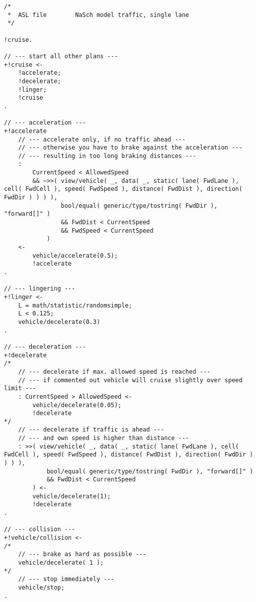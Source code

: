 \begin{lstlisting}[style=asl, 
                   keywords={+!cruise,+!accelerate,+!linger,+!decelerate,+!vehicle/collision}, 
                   keywords={[2]}, 
                   keywords={[3]}, 
                   caption={Agentenscript: NaSch-Modell, einspurig},
                   label={lst:nasch}]      
/*
 *  ASL file        NaSch model traffic, single lane
 */

!cruise.

// --- start all other plans ---
+!cruise <-
    !accelerate;
    !decelerate;
    !linger;
    !cruise
.

// --- acceleration ---
+!accelerate
    // --- accelerate only, if no traffic ahead ---
    // --- otherwise you have to brake against the acceleration ---
    // --- resulting in too long braking distances ---
    : 
        CurrentSpeed < AllowedSpeed
        && ~>>( view/vehicle( _, data( _, static( lane( FwdLane ), cell( FwdCell ), speed( FwdSpeed ), distance( FwdDist ), direction( FwdDir ) ) ) ),
                bool/equal( generic/type/tostring( FwdDir ), "forward[]" )
                && FwdDist < CurrentSpeed
                && FwdSpeed < CurrentSpeed
            )
    <-
        vehicle/accelerate(0.5);
        !accelerate
.

// --- lingering ---
+!linger <-
    L = math/statistic/randomsimple;
    L < 0.125;
    vehicle/decelerate(0.3)
.

// --- deceleration ---
+!decelerate 
/*
    // --- decelerate if max. allowed speed is reached ---
    // --- if commented out vehicle will cruise slightly over speed limit ---
    : CurrentSpeed > AllowedSpeed <-
        vehicle/decelerate(0.05);
        !decelerate
*/
    // --- decelerate if traffic is ahead ---
    // --- and own speed is higher than distance ---
    : >>( view/vehicle( _, data( _, static( lane( FwdLane ), cell( FwdCell ), speed( FwdSpeed ), distance( FwdDist ), direction( FwdDir ) ) ) ), 
            bool/equal( generic/type/tostring( FwdDir ), "forward[]" ) 
            && FwdDist < CurrentSpeed
        ) <-
        vehicle/decelerate(1);
        !decelerate
.

// --- collision ---
+!vehicle/collision <-
/*
    // --- brake as hard as possible ---
    vehicle/decelerate( 1 );
*/
    // --- stop immediately ---
    vehicle/stop;
.\end{lstlisting}


\newpage

